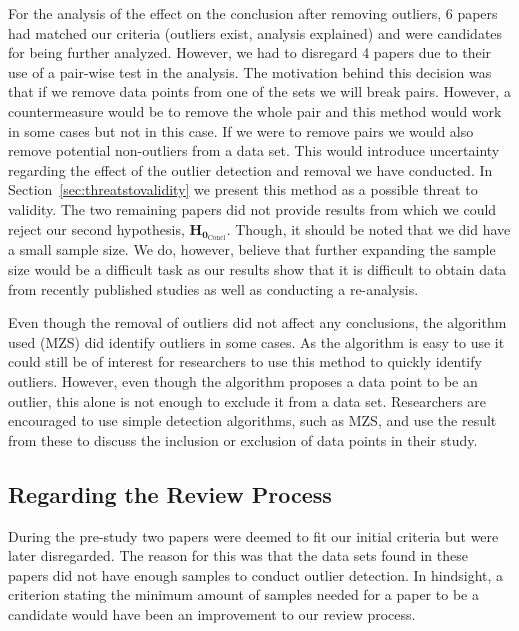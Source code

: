 For the analysis of the effect on the conclusion after removing outliers, 6 papers had matched our criteria (outliers exist, analysis explained) and were candidates for being further analyzed. However, we had to disregard 4 papers due to their use of a pair-wise test in the analysis. The motivation behind this decision was that if we remove data points from one of the sets we will break pairs. However, a countermeasure would be to remove the whole pair and this method would work in some cases but not in this case. If we were to remove pairs we would also remove potential non-outliers from a data set. This would introduce uncertainty regarding the effect of the outlier detection and removal we have conducted. In Section~\ref{sec:threatstovalidity} we present this method as a possible threat to validity. The two remaining papers did not provide results from which we could reject our second hypothesis, $\mathbf{H_{0_{\mathrm{Concl}}}}$. Though, it should be noted that we did have a small sample size. We do, however, believe that further expanding the sample size would be a difficult task as our results show that it is difficult to obtain data from recently published studies as well as conducting a re-analysis.




Even though the removal of outliers did not affect any conclusions, the algorithm used (MZS) did identify outliers in some cases. As the algorithm is easy to use it could still be of interest for researchers to use this method to quickly identify outliers. However, even though the algorithm proposes a data point to be an outlier, this alone is not enough to exclude it from a data set. Researchers are encouraged to use simple detection algorithms, such as MZS, and use the result from these to discuss the inclusion or exclusion of data points in their study.




\subsection{Regarding the Review Process}
\label{sec:discussion-method}
During the pre-study two papers were deemed to fit our initial criteria but were later disregarded. The reason for this was that the data sets found in these papers did not have enough samples to conduct outlier detection. In hindsight, a criterion stating the minimum amount of samples needed for a paper to be a candidate would have been an improvement to our review process.


